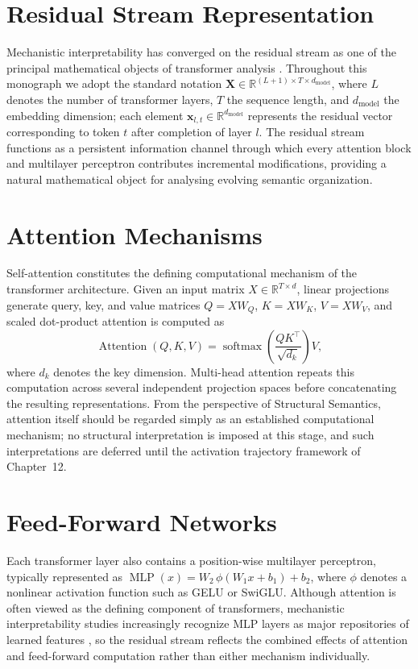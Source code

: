 \documentclass[11pt,twoside,openright]{book}
\numberwithin{equation}{chapter}
\theoremstyle{definition}
\theoremstyle{plain}
\theoremstyle{remark}
\theoremstyle{definition}
\begin{document}
\section{Residual Stream Representation}

Mechanistic interpretability has converged on the residual stream as one
of the principal mathematical objects of transformer analysis
\cite{Elhage2021,Olah2020,Nanda2023}. Throughout this monograph we adopt
the standard notation $\mathbf{X}\in\mathbb{R}^{(L+1)\times T\times
d_{\mathrm{model}}}$, where $L$ denotes the number of transformer layers,
$T$ the sequence length, and $d_{\mathrm{model}}$ the embedding
dimension; each element $\mathbf{x}_{l,t}\in\mathbb{R}^{d_{\mathrm{model}}}$
represents the residual vector corresponding to token $t$ after
completion of layer $l$. The residual stream functions as a persistent
information channel through which every attention block and multilayer
perceptron contributes incremental modifications, providing a natural
mathematical object for analysing evolving semantic organization.

\section{Attention Mechanisms}

Self-attention constitutes the defining computational mechanism of the
transformer architecture. Given an input matrix $X\in\mathbb{R}^{T\times
d}$, linear projections generate query, key, and value matrices
$Q=XW_Q$, $K=XW_K$, $V=XW_V$, and scaled dot-product attention is computed
as
\[
\operatorname{Attention}(Q,K,V)
=
\operatorname{softmax}\!\left(\frac{QK^{\top}}{\sqrt{d_k}}\right)V,
\]
where $d_k$ denotes the key dimension. Multi-head attention repeats this
computation across several independent projection spaces before
concatenating the resulting representations. From the perspective of
Structural Semantics, attention itself should be regarded simply as an
established computational mechanism; no structural interpretation is
imposed at this stage, and such interpretations are deferred until the
activation trajectory framework of Chapter~12.

\section{Feed-Forward Networks}

Each transformer layer also contains a position-wise multilayer
perceptron, typically represented as
$\operatorname{MLP}(x)=W_2\,\phi(W_1x+b_1)+b_2$, where $\phi$ denotes a
nonlinear activation function such as GELU or SwiGLU. Although attention
is often viewed as the defining component of transformers, mechanistic
interpretability studies increasingly recognize MLP layers as major
repositories of learned features \cite{Geva2022}, so the residual stream
reflects the combined effects of attention and feed-forward computation
rather than either mechanism individually.
\end{document}
